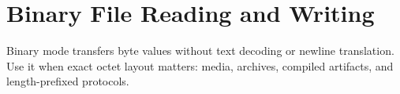 \section{Binary File Reading and Writing}

Binary mode transfers byte values without text decoding or newline translation. Use it when exact octet layout matters: media, archives, compiled artifacts, and length-prefixed protocols.
